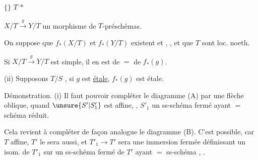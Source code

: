 
 $\{$$\}$ $T$   $*$

$X/T\xrightarrow{g}Y/T$ un morphisme   de $T$-préschémas.

On suppose que $f_*(X/T)$ et $f_*(Y/T)$ existent et  , , et que  $T$ sont loc. noeth.

Si $X/T\xrightarrow{g}Y/T$ est simple, il en est de $=$ de $f_*(g)$.


(ii) Supposons $T/S$  , si $g$ est \uline{étale}, $f_*(g)$ est étale.

Démonstration. (i) Il faut pouvoir compléter le diagramme (A) par une flèche oblique,  quand $\unsure{S'|S'_1}$ est affine, , $S'_1$ un ss-schéma fermé ayant $=$ schéma réduit.

Cela revient à compléter de façon analogue le diagramme (B). C'est possible, car $T$  affine, $T'$ le sera aussi, et $T'_1\to T'$ sera une immersion fermée définissant un isom. de $T'_1$ sur un ss-schéma fermé de $T'$ ayant $=$ ss-schéma ,  .
